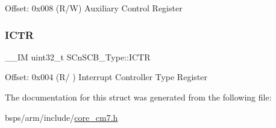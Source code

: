 Offset\+: 0x008 (R/W) Auxiliary Control Register \mbox{\label{structSCnSCB__Type_a34ec1d771245eb9bd0e3ec9336949762}} 
\subsubsection{\texorpdfstring{ICTR}{ICTR}}
{\footnotesize\ttfamily \+\_\+\+\_\+\+IM uint32\+\_\+t S\+Cn\+S\+C\+B\+\_\+\+Type\+::\+I\+C\+TR}

Offset\+: 0x004 (R/ ) Interrupt Controller Type Register 

The documentation for this struct was generated from the following file\+:\begin{DoxyCompactItemize}
\item 
bsps/arm/include/\mbox{\hyperlink{core__cm7_8h}{core\+\_\+cm7.\+h}}\end{DoxyCompactItemize}
